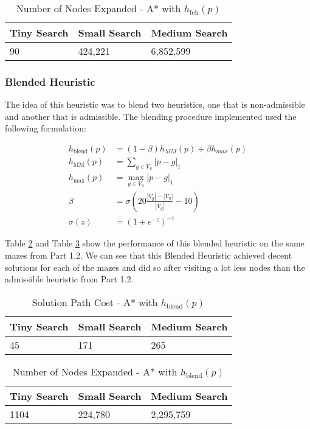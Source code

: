 \documentclass{article}[12pt]
\begin{document}
   \begin{table}[ht]
   \centering
   \begin{tabular}{l | l | l  }
   \hline
    Tiny Search & Small Search & Medium Search\\
    \hline \hline 
   90 & 424,221 &  6,852,599\\
   \hline
   \end{tabular}
   \caption{Number of Nodes Expanded - A* with $h_{\text{fch}}(p)$} \label{tab:nnodefch}
   \end{table}   
   
   \subsubsection{Blended Heuristic}
   The idea of this heuristic was to blend two heuristics, one that is non-admissible and another that is admissible. The blending procedure implemented used the following formulation:
   
   \begin{align*}
   h_{\text{blend}}(p) &= \left( 1 - \beta \right) h_{MM}(p) + \beta h_{max}(p) \\
   h_{\text{MM}}(p) &= \sum_{ g \in V_{u} } |p - g|_1 \\
   h_{\text{max}}(p) &= \max_{g \in V_{u} } |p - g|_1 \\
   \beta &= \sigma\left( 20 \frac{|V_g| - |V_u|}{|V_g|} - 10 \right) \\
   \sigma(z) &= \left(1 + e^{-z} \right)^{-1}
   \end{align*}
   
   Table \ref{tab:solblend} and Table \ref{tab:nnodeblend} show the performance of this blended heuristic on the same mazes from Part 1.2. We can see that this Blended Heuristic achieved decent solutions for each of the mazes and did so after visiting a lot less nodes than the admissible heuristic from Part 1.2. 
   
   
   \begin{table}[ht]
   \centering
   \begin{tabular}{l | l | l  }
   \hline
    Tiny Search & Small Search & Medium Search\\
    \hline \hline 
   45 & 171 & 265 \\
   \hline
   \end{tabular}
   \caption{Solution Path Cost - A* with $h_{\text{blend}}(p)$} \label{tab:solblend}
   \end{table}
   
   \begin{table}[ht]
   \centering
   \begin{tabular}{l | l | l  }
   \hline
    Tiny Search & Small Search & Medium Search\\
    \hline \hline 
   1104 & 224,780 &  2,295,759\\
   \hline
   \end{tabular}
   \caption{Number of Nodes Expanded - A* with $h_{\text{blend}}(p)$} \label{tab:nnodeblend}
   \end{table}   
   
\end{document}
